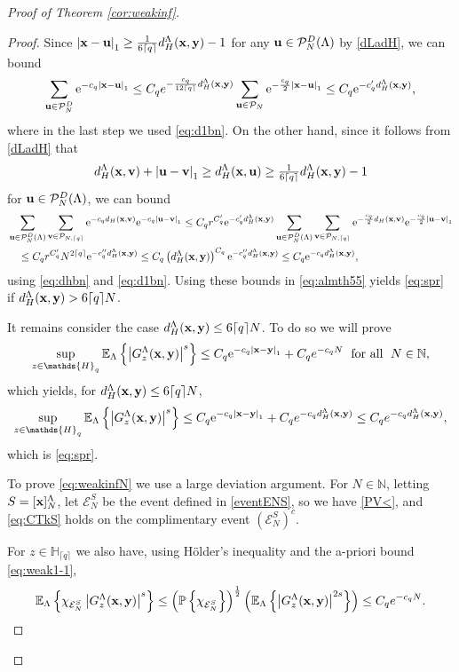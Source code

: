 \documentclass[12pt, a4paper,reqno]{amsart}
\numberwithin{equation}{section}
\newcommand\N{\mathbb N}
\newcommand\x{\mathbf{x}}
\newcommand\y{\mathbf{y}}
\newcommand\e{\mathrm{e}}
\renewcommand\P{\mathbb P}
\newcommand\E{\mathbb E}
\newcommand\cE{\mathcal{E}}
\newcommand\cP{\mathcal{P}}
\newcommand{\pr}{\prime}
\newcommand\be{\begin{equation}\begin{aligned}}
\newcommand\ee{\end{aligned}\end{equation}}
\newcommand{\abs}[1]{\left\lvert #1 \right\rvert}
\newcommand{\set}[1]{\left\{ #1 \right\}}
\newcommand{\pa}[1]{\left( #1 \right)}
\newcommand{\cl}[1]{\lceil #1 \rceil}
\newcommand\La{\Lambda}
\newcommand{\eq}[1]{\eqref{#1}}
\newcommand{\mqtx}[1]{\; \ \text{#1}\; \  }
\newcommand{\prr}{{\pr\pr}}
\newcommand{\clq}{\cl{q}}
\begin{document}
\begin{proof}[Proof of  Theorem \ref{cor:weakinf}]
\begin{proof}
Since $\abs{{\bf x}-{\bf u}}_1\ge \tfrac 1 {6\cl{q}} d_H^\La(\x,\y)-1 $ for any ${\bf u}\in\cP^D_N(\La)$ by  \eq{dLadH}, we can bound
\be
\sum_{{\bf u}\in \cP^D_{N}}\e^{-c_q  \abs{{\bf x}-{\bf u}}_1}\le C_q e^{-\frac {c_q } {12\cl{q}} d_H^\La(\x,\y)}\sum_{{\bf u}\in \cP_{N}} \e^{-\frac {c_q} 2 \abs{{\bf x}-{\bf u}}_1}
\le C_q \e^{-c_q^\pr  d_H^\La(\x,\y)},
\ee 
where in the last step we used \eqref{eq:d1bn}. On the other hand, since it follows from \eq{dLadH} that 
\be
d_H^\La ({\bf x},{\bf v})+\abs{{\bf u}-{\bf v}}_1\ge d_H^\La ({\bf x},{\bf u})\ge   \tfrac 1 {6\cl{q}} d_H^\La(\x,\y)-1
\ee
for ${\bf u}\in \cP^D_N(\La)$, we can bound
    \be
&\sum_{{\bf u}\in \cP^D_N(\La)}\sum_{{\bf v}\in\cP_{N,\cl{q}}}   \e^{-c_q d_H ({\bf x},{\bf v})} \e^{-c_q \abs{{\bf u}-{\bf v}}_1}\le C_q r^{C^\pr_q}\e^{-c_q^\pr  d_H^\La(\x,\y)}\sum_{{\bf u}\in \cP^D_N(\La)}\sum_{{\bf v}\in\cP_{N,\cl{q}}}  \e^{-\frac  {c_q}2 d_H ({\bf x},{\bf v})} \e^{-\frac {c_q}2 \abs{{\bf u}-{\bf v}}_1}\\& \quad  \le C_q  r^{C^\pr_q}N^{2\cl{q}}\e^{-c_q^{\prr } d_H^\La(\x,\y)} \le C_q  \pa{d_H^\La(\x,\y)}^{C_q}\e^{-c_q^{\prr } d_H^\La(\x,\y)}
\le  C_q  \e^{-c_qd_H^\La(\x,\y)},
\ee
using \eqref{eq:dhbn} and \eqref{eq:d1bn}.  Using these bounds in \eqref{eq:almth55} yields \eq{eq:spr} if $d_H^\La ({\bf x},{\bf y})>6\cl{q}N$.  

It remains consider the case $d_H^\La ({\bf x},{\bf y})\le6\cl{q}N$.  To do so we   will prove
\be\label{eq:weakinfN}
 \sup_{z\in\mathds{H}_q}\E_\La\set{\abs{G^{\La}_{z}({\bf x},{\bf y})}^s}\le C_q\e^{-c_q \abs{{\bf x}-{\bf y}}_1}+C_qe^{-c_qN}\mqtx{for all}  N \in \N,
\ee 
which yields, for $d_H^\La ({\bf x},{\bf y})\le6\cl{q}N$,
\be\label{eq:weakinfN987}
 \sup_{z\in\mathds{H}_q}\E_\La\set{\abs{G^{\La}_{z}({\bf x},{\bf y})}^s}\le C_q\e^{-c_q \abs{{\bf x}-{\bf y}}_1}+C_qe^{-c_qd_H^\La ({\bf x},{\bf y})}  \le C_qe^{-c_qd_H^\La ({\bf x},{\bf y})},
\ee 
which is \eq{eq:spr}.

To prove \eq{eq:weakinfN} we use a large deviation argument.
For $N\in \N$,   letting $S=[{\bf x}]^\La_N$, let $\cE^S_N$ be the event defined in \eq{eventENS}, so we have 
\eq{PV<}, and \eq{eq:CTkS} holds  on the  complimentary event   $\pa{\cE_N^S}^c $.


 For $z\in \mathds{H}_{\clq}$  we also  have, using  H\"older's inequality  and the a-priori bound \eqref{eq:weak1-1},
  \be\label{eq:smset999}
\E_{\La}\set{\chi_{\cE_N^S}\abs{ G^{\La}_{z}({\bf x},{\bf y})}^s}\le\pa{ \P\set{\chi_{\cE_N^S} }}^{\frac 12}
\pa{\E_{\La}\set{\abs{ G^{\La}_{z}({\bf x},{\bf y})}^{2s}}}
\le C_q e^{-c_qN}.
\ee
  

\end{proof}
\end{proof}
\end{document}
